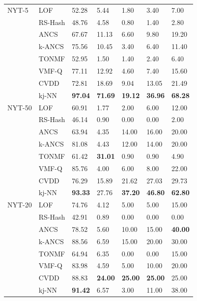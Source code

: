 \begin{table}
\begin{tabularx}{\columnwidth}{@{}XXXXXXX@{}}
NYT-5    & \gls{LOF}     & 52.28 & 5.44  & 1.80  & 3.40  & 7.00  \\
         & \gls{RS-Hash} & 48.76 & 4.58  & 0.80  & 1.40  & 2.80  \\
         & \gls{ANCS}     & 67.67 & 11.13 & 6.60  & 9.80  & 19.20 \\
         & \gls{k-ANCS}   & 75.56 & 10.45 & 3.40  & 6.40  & 11.40 \\
         & \gls{TONMF}   & 52.95 &	1.50 &	1.40  &	2.40 &	6.40      \\
         & \gls{VMF-Q}   & 77.11 & 12.92 & 4.60  & 7.40  & 15.60 \\
         & \gls{CVDD}     & 72.81	& 18.69	 & 9.04	 &13.05	 & 21.49  \\
         & \gls{kj-NN}   &\bfseries 97.04 &\bfseries	71.69 &\bfseries	19.12 &\bfseries	36.96 &\bfseries	68.28 \\ \midrule

NYT-50   & \gls{LOF}     & 60.91 &	1.77 &	2.00 &	6.00 &	12.00 	 \\
         & \gls{RS-Hash} & 46.14 & 0.90  & 0.00  & 0.00  & 2.00  \\
         & \gls{ANCS}     & 63.94 & 4.35  & 14.00 & 16.00 & 20.00 \\
         & \gls{k-ANCS}   & 81.08 &	4.43 &	12.00 &	14.00 &	20.00 	 \\
         & \gls{TONMF}   & 61.42 & \bfseries 31.01 &	0.90 &	0.90 &	4.90  \\
         & \gls{VMF-Q}   & 85.76 & 4.00  & 6.00  & 8.00  & 22.00 \\
         & \gls{CVDD}     &76.29	& 15.89	 & 21.62 &	27.03 &	29.73 \\
         & \gls{kj-NN}   &\bfseries 93.33 &	27.76 &\bfseries	37.20 &\bfseries 	46.80 &\bfseries 	62.80 	 \\ \midrule

NYT-20   & \gls{LOF}     & 74.76 &	4.12 &	5.00 &	5.00 &	15.00 	 \\
         & \gls{RS-Hash} & 42.91 & 0.89  & 0.00  & 0.00  & 0.00  \\
         & \gls{ANCS}     & 78.52 & 5.60  & 10.00 & 15.00 & \bfseries40.00 \\
         & \gls{k-ANCS}   & 88.56  &	6.59 &	15.00  & 20.00 &	30.00 \\
         & \gls{TONMF}   & 64.94 & 6.35  & 0.00 	 & 0.00 	 & 15.00  \\
         & \gls{VMF-Q}   & 83.98 & 4.59  & 5.00  & 10.00 & 20.00 \\
         & \gls{CVDD}     & 88.83 & \bfseries 24.00 & \bfseries25.00	& \bfseries25.00 &	25.00  \\
         & \gls{kj-NN}   &\bfseries 91.42 &	6.57 &	3.00 &	11.00 &	38.00 \\ \midrule


\end{tabularx}
\end{table}
